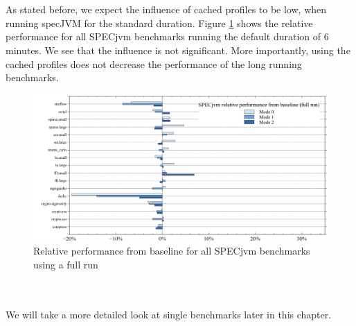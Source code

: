 \\\\
As stated before, we expect the influence of cached profiles to be low, when running specJVM for the standard duration. Figure \ref{f:all_full_variation} shows the relative performance for all SPECjvm benchmarks running the default duration of 6 minutes.
We see that the influence is not significant. More importantly, using the cached profiles does not decrease the performance of the long running benchmarks.
\begin{figure}[ht]
  \begin{center}
    \centering
    \includegraphics[width=1.0\textwidth]{figures/all_full_variation.png}
    \caption{Relative performance from baseline for all SPECjvm benchmarks using a full run}
    \label{f:all_full_variation}
  \end{center}
\end{figure}
\\\\
We will take a more detailed look at single benchmarks later in this chapter. 
